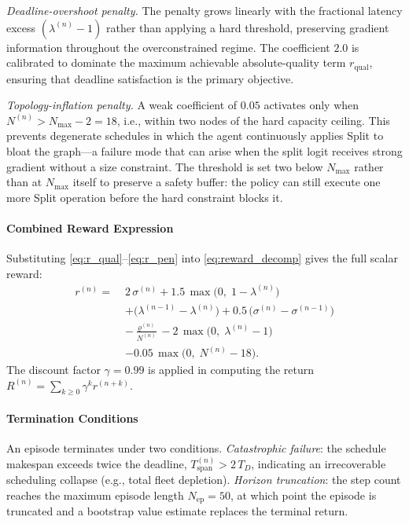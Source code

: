 \textit{Deadline-overshoot penalty.}
The penalty grows linearly with the fractional latency excess
$(\lambda^{(n)} - 1)$ rather than applying a hard threshold,
preserving gradient information throughout the overconstrained
regime.
The coefficient $2.0$ is calibrated to dominate the maximum
achievable absolute-quality term $r_{\mathrm{qual}}$, ensuring
that deadline satisfaction is the primary objective.

\textit{Topology-inflation penalty.}
A weak coefficient of $0.05$ activates only when
$N^{(n)} > N_{\max} - 2 = 18$, i.e., within two nodes of the hard
capacity ceiling.
This prevents degenerate schedules in which the agent continuously
applies Split to bloat the graph—a failure mode that can arise
when the split logit receives strong gradient without a size
constraint.
The threshold is set two below $N_{\max}$ rather than at $N_{\max}$
itself to preserve a safety buffer: the policy can still execute one
more Split operation before the hard constraint blocks it.

\paragraph{Combined Reward Expression}

Substituting \eqref{eq:r_qual}--\eqref{eq:r_pen} into
\eqref{eq:reward_decomp} gives the full scalar reward:
\begin{align}
  r^{(n)} =\;&
    2\,\sigma^{(n)}
    + 1.5\,\max\!\bigl(0,\;1-\lambda^{(n)}\bigr)
    \nonumber\\
    &+ \bigl(\lambda^{(n-1)} - \lambda^{(n)}\bigr)
    + 0.5\,\bigl(\sigma^{(n)} - \sigma^{(n-1)}\bigr)
    \nonumber\\
    &- \frac{\varrho^{(n)}}{N^{(n)}}
    - 2\,\max\!\bigl(0,\;\lambda^{(n)}-1\bigr)
    \nonumber\\
    &- 0.05\,\max\!\bigl(0,\;N^{(n)}-18\bigr).
  \label{eq:reward_full}
\end{align}
The discount factor $\gamma = 0.99$ is applied in computing the
return $R^{(n)} = \sum_{k \geq 0} \gamma^k r^{(n+k)}$.

\paragraph{Termination Conditions}

An episode terminates under two conditions.
\textit{Catastrophic failure}: the schedule makespan exceeds twice
the deadline, $T_{\mathrm{span}}^{(n)} > 2\,T_D$, indicating an
irrecoverable scheduling collapse (e.g., total fleet depletion).
\textit{Horizon truncation}: the step count reaches the maximum
episode length $N_{\mathrm{ep}} = 50$, at which point the episode
is truncated and a bootstrap value estimate replaces the terminal
return.
